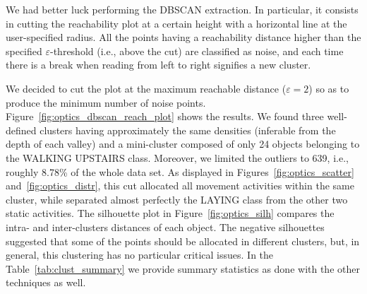\documentclass[10pt, a4paper, twocolumn]{article}
\begin{document}
We had better luck performing the DBSCAN extraction. In particular, it consists in cutting the reachability plot at a certain height with a horizontal line at the user-specified radius. All the points having a reachability distance higher than the specified $\varepsilon$-threshold (i.e., above the cut) are classified as noise, and each time there is a break when reading from left to right signifies a new cluster. 

We decided to cut the plot at the maximum reachable distance ($\varepsilon=2$) so as to produce the minimum number of noise points. Figure~\ref{fig:optics_dbscan_reach_plot} shows the results. We found three well-defined clusters having approximately the same densities (inferable from the depth of each valley) and a mini-cluster composed of only 24 objects belonging to the WALKING UPSTAIRS class. Moreover, we limited the outliers to 639, i.e., roughly 8.78\% of the whole data set. As displayed in Figures~\ref{fig:optics_scatter} and~\ref{fig:optics_distr}, this cut allocated all movement activities within the same cluster, while separated almost perfectly the LAYING class from the other two static activities. The silhouette plot in Figure~\ref{fig:optics_silh} compares the intra- and inter-clusters distances of each object. The negative silhouettes suggested that some of the points should be allocated in different clusters, but, in general, this clustering has no particular critical issues. In the Table~\ref{tab:clust_summary} we provide summary statistics as done with the other techniques as well. 

\begin{table}
    \centering
    \caption{Clustering Algorithm: summary table. Please, note that for the OPTICS algorithm the cluster $C_0$ refers to the set of noise points. The silhouette score was computed without considering these points.}
    \label{tab:clust_summary}
\end{table}
\end{document}
